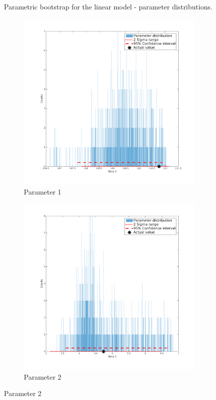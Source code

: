 \documentclass[11pt,a4paper,oneside]{report}
\begin{document}
\begin{figure}[H]
  \caption{Parametric bootstrap for the linear model - parameter distributions.}
  \label{fig:c5distM1}
\end{figure}

\begin{figure}[H]
\centering
  \begin{subfigure}[b]{0.5\textwidth}
    \includegraphics[width=\textwidth, trim=0 0 0 0,clip=true]{figures/task5/parDistM2P1.png}
    \caption{Parameter 1}
  \end{subfigure}%
  \begin{subfigure}[b]{0.5\textwidth}
    \includegraphics[width=\textwidth, trim=0 0 0 0,clip=true]{figures/task5/parDistM2P2.png}
    \caption{Parameter 2}
  \end{subfigure}%
  

\end{figure}
\end{document}
